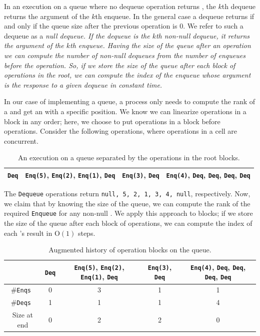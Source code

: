 In an execution on a queue where no dequeue operation returns
, the $k$th dequeue returns the argument of the $k$th
enqueue. In the general case a dequeue returns  if and only
if the queue size after the previous operation is 0. We refer to such
a dequeue as a \it{null dequeue}. If the dequeue is the $k$th non-null
dequeue, it returns the argument of the $k$th enqueue. Having the size
of the queue after an operation we can compute the number of non-null
dequeues from the number of enqueues before the operation. So, if we
store the size of the queue after each block of operations in the
root, we can compute the index of the enqueue whose argument is the
response to a given dequeue in constant time. 

In our case of implementing a queue, a process only needs to compute
the rank of a  and get an  with a specific
position.  We know we can linearize operations in a block in any
order; here, we choose to put  operations in a block
before  operations. Consider the following operations,
where operations in a cell are concurrent. 
\begin{table}[hbtp]
\centering
\begin{small}
\begin{tabular}{c|c|c|c}
    \hline \texttt{Deq} & \texttt{Enq(5)}, \texttt{Enq(2)}, \texttt{Enq(1)}, \texttt{Deq}& \texttt{Enq(3)}, \texttt{Deq}&  \texttt{Enq(4)}, \texttt{Deq}, \texttt{Deq}, \texttt{Deq}, \texttt{Deq}\\ \hline
  \end{tabular}
\end{small}
\caption{An execution on a queue separated by the operations in the root blocks.}
\end{table}

\noindent The \texttt{Dequeue} operations return \texttt{null, 5, 2,
  1, 3, 4, null}, respectively. 
Now, we claim that by knowing the size of the queue, we can compute
the rank of the required \texttt{Enqueue} for any non-null
. We apply this approach to blocks; if we store the size
of the queue after each block of operations, we can compute the index
of each 's result in \textsc{O}$(1)$ steps. 

\begin{table}[hbtp]
\centering
\begin{small}
  \begin{tabular}{c|c|c|c|c}
    \hline &\texttt{Deq} & \texttt{Enq(5)}, \texttt{Enq(2)}, \texttt{Enq(1)}, \texttt{Deq}& \texttt{Enq(3)}, \texttt{Deq}&  \texttt{Enq(4)}, \texttt{Deq}, \texttt{Deq}, \texttt{Deq}, \texttt{Deq}\\ \hline
    \#\tt{Enq}s & 0 & 3 & 1 & 1 \\ \hline
    \#\tt{Deq}s & 1 & 1 & 1 & 4 \\ \hline
    Size at end & 0 & 2 & 2 & 0 \\ \hline
  \end{tabular}
\end{small}
  \caption{Augmented history of operation blocks on the queue.}
\end{table}

